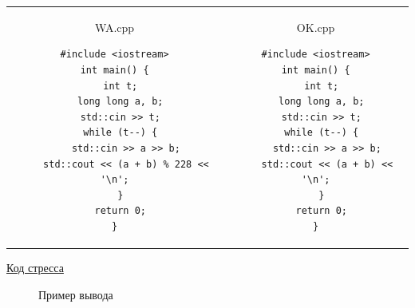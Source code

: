 \begin{tabular}{cc}
	\begin{minipage}{9cm}
		WA.cpp
		\begin{verbatim}
#include <iostream>
int main() {
  int t;
  long long a, b;
  std::cin >> t;
  while (t--) {
    std::cin >> a >> b;
    std::cout << (a + b) % 228 << '\n';
  }
  return 0;
}
		\end{verbatim}
	\end{minipage} 
	&
	\begin{minipage}{8cm}
		OK.cpp
		\begin{verbatim}
#include <iostream>
int main() {
  int t;
  long long a, b;
  std::cin >> t;
  while (t--) {
    std::cin >> a >> b;
    std::cout << (a + b) << '\n';
  }
  return 0;
}
		\end{verbatim}
	\end{minipage} 
\end{tabular}

\down

\href{https://pastebin.com/cRGvAuPJ}{Код стресса}

\begin{center}
	\begin{figure}[h]
		\captionsetup{font=small, labelformat=empty}
		\caption{Пример вывода}
		\label{fig:image}
	\end{figure}
\end{center}


